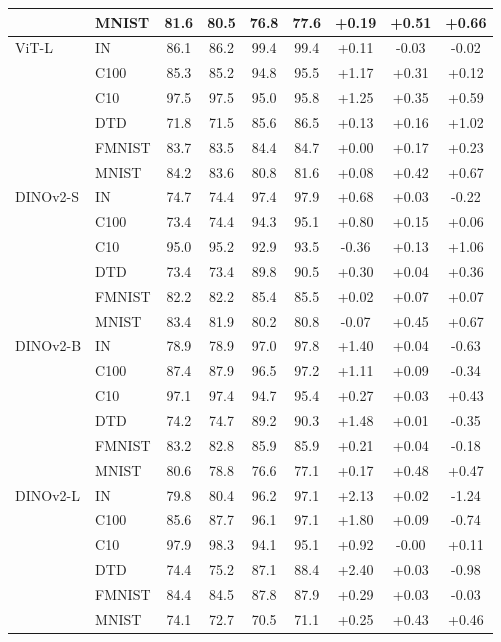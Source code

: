 \begin{table}[H]
\begin{tabular}{llccccccc}
 & MNIST & 81.6 & 80.5 & 76.8 & 77.6 & +0.19 & +0.51 & +0.66 \\
\midrule
ViT-L & IN & 86.1 & 86.2 & 99.4 & 99.4 & +0.11 & -0.03 & -0.02 \\
 & C100 & 85.3 & 85.2 & 94.8 & 95.5 & +1.17 & +0.31 & +0.12 \\
 & C10 & 97.5 & 97.5 & 95.0 & 95.8 & +1.25 & +0.35 & +0.59 \\
 & DTD & 71.8 & 71.5 & 85.6 & 86.5 & +0.13 & +0.16 & +1.02 \\
 & FMNIST & 83.7 & 83.5 & 84.4 & 84.7 & +0.00 & +0.17 & +0.23 \\
 & MNIST & 84.2 & 83.6 & 80.8 & 81.6 & +0.08 & +0.42 & +0.67 \\
\midrule
DINOv2-S & IN & 74.7 & 74.4 & 97.4 & 97.9 & +0.68 & +0.03 & -0.22 \\
 & C100 & 73.4 & 74.4 & 94.3 & 95.1 & +0.80 & +0.15 & +0.06 \\
 & C10 & 95.0 & 95.2 & 92.9 & 93.5 & -0.36 & +0.13 & +1.06 \\
 & DTD & 73.4 & 73.4 & 89.8 & 90.5 & +0.30 & +0.04 & +0.36 \\
 & FMNIST & 82.2 & 82.2 & 85.4 & 85.5 & +0.02 & +0.07 & +0.07 \\
 & MNIST & 83.4 & 81.9 & 80.2 & 80.8 & -0.07 & +0.45 & +0.67 \\
\midrule
DINOv2-B & IN & 78.9 & 78.9 & 97.0 & 97.8 & +1.40 & +0.04 & -0.63 \\
 & C100 & 87.4 & 87.9 & 96.5 & 97.2 & +1.11 & +0.09 & -0.34 \\
 & C10 & 97.1 & 97.4 & 94.7 & 95.4 & +0.27 & +0.03 & +0.43 \\
 & DTD & 74.2 & 74.7 & 89.2 & 90.3 & +1.48 & +0.01 & -0.35 \\
 & FMNIST & 83.2 & 82.8 & 85.9 & 85.9 & +0.21 & +0.04 & -0.18 \\
 & MNIST & 80.6 & 78.8 & 76.6 & 77.1 & +0.17 & +0.48 & +0.47 \\
\midrule
DINOv2-L & IN & 79.8 & 80.4 & 96.2 & 97.1 & +2.13 & +0.02 & -1.24 \\
 & C100 & 85.6 & 87.7 & 96.1 & 97.1 & +1.80 & +0.09 & -0.74 \\
 & C10 & 97.9 & 98.3 & 94.1 & 95.1 & +0.92 & -0.00 & +0.11 \\
 & DTD & 74.4 & 75.2 & 87.1 & 88.4 & +2.40 & +0.03 & -0.98 \\
 & FMNIST & 84.4 & 84.5 & 87.8 & 87.9 & +0.29 & +0.03 & -0.03 \\
 & MNIST & 74.1 & 72.7 & 70.5 & 71.1 & +0.25 & +0.43 & +0.46 \\

\end{tabular}
\end{table}
